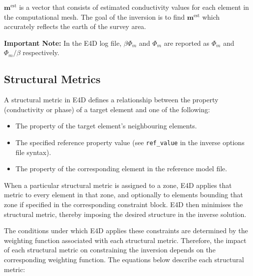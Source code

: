 \documentclass[a4paper,12pt]{article}
\begin{document}
\(\mathbf{m}^{\text{est}}\) is a vector that consists of estimated conductivity values for each element in the computational mesh. The goal of the inversion is to find \(\mathbf{m}^{\text{est}}\) which accurately reflects the earth of the survey area.

\begin{framed}
    \noindent \textbf{Important Note:} In the E4D log file, $\beta \Phi_m$ and $\Phi_m$ are reported as $\Phi_m$ and $\Phi_m / \beta$ respectively.
\end{framed}

\subsection{Structural Metrics} \label{structural_metrics}

A structural metric in E4D defines a relationship between the property
(conductivity or phase) of a target element and one of the following:

\begin{itemize}
    \item The property of the target element's neighbouring elements.
    \item The specified reference property value (see \texttt{ref\_value} in the inverse
          options file syntax).
    \item The property of the corresponding element in the reference model file.
\end{itemize}

When a particular structural metric is assigned to a zone, E4D applies that
metric to every element in that zone, and optionally to elements bounding that
zone if specified in the corresponding constraint block. E4D then minimises the
structural metric, thereby imposing the desired structure in the inverse
solution.

The conditions under which E4D applies these constraints are determined by the
weighting function associated with each structural metric. Therefore, the
impact of each structural metric on constraining the inversion depends on the
corresponding weighting function. The equations below describe each structural
metric:
\end{document}
